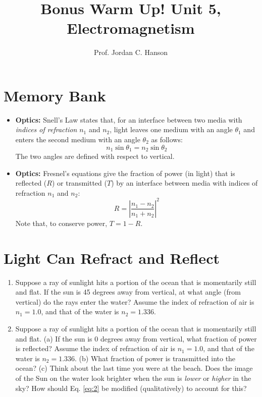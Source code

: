 \documentclass{article}
\begin{document}
\title{Bonus Warm Up!  Unit 5, Electromagnetism}
\author{Prof. Jordan C. Hanson}

\maketitle

\section{Memory Bank}

\begin{itemize}
\item \textbf{Optics:} Snell's Law states that, for an interface between two media with \textit{indices of refraction} $n_1$ and $n_2$, light leaves one medium with an angle $\theta_1$ and enters the second medium with an angle $\theta_2$ as follows:
\begin{equation}
n_1 \sin\theta_1 = n_2\sin\theta_2
\end{equation}
\noindent The two angles are defined with respect to vertical.
\item \textbf{Optics:} Fresnel's equations give the fraction of power (in light) that is reflected ($R$) or transmitted ($T$) by an interface between media with indices of refraction $n_1$ and $n_2$:
\begin{equation}
R = \left| \frac{n_1 - n_2}{n_1 + n_2} \right|^2 \label{eq:2}
\end{equation}
\noindent Note that, to conserve power, $T = 1 - R$.
\end{itemize}

\section{Light Can Refract and Reflect}

\begin{enumerate}
\item Suppose a ray of sunlight hits a portion of the ocean that is momentarily still and flat.  If the sun is 45 degrees away from vertical, at what angle (from vertical) do the rays enter the water?  Assume the index of refraction of air is $n_1 = 1.0$, and that of the water is $n_2 = 1.336$. \\ \vspace{2cm}
\item Suppose a ray of sunlight hits a portion of the ocean that is momentarily still and flat.  (a) If the sun is 0 degrees away from vertical, what fraction of power is reflected?  Assume the index of refraction of air is $n_1 = 1.0$, and that of the water is $n_2 = 1.336$. (b) What fraction of power is transmitted into the ocean?  (c) Think about the last time you were at the beach.  Does the image of the Sun on the water look brighter when the sun is \textit{lower} or \textit{higher} in the sky?  How should Eq. \ref{eq:2} be modified (qualitatively) to account for this? \\ \vspace{2cm}
\end{enumerate}
\end{document}
